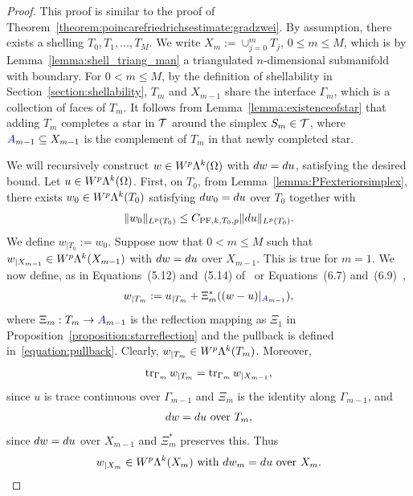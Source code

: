 \documentclass[10pt,a4paper]{article}
\begin{document}
\begin{proof}
    This proof is similar to the proof of Theorem~\ref{theorem:poincarefriedrichsestimate:gradzwei}.
    By assumption, there exists a shelling $T_0, T_1, \dots, T_{M}$. 
    We write $X_m := \cup_{j=0}^{m} T_j$, $0 \leq m \leq M$, which is by Lemma~\ref{lemma:shell_triang_man} a triangulated $n$-dimensional submanifold with boundary. 
    For $0 < m \leq M$, by the definition of shellability in Section~\ref{section:shellability}, 
    $T_{m}$ and $X_{m-1}$ share the interface $\Gamma_{m}$, which is a collection of faces of $T_{m}$. 
    It follows from Lemma~\ref{lemma:existenceofstar} that adding $T_{m}$ completes a star in ${\mathcal T}$ around the simplex $S_{m} \in {\mathcal T}$, 
    where ${\color{blue}A}_{m-1} \subseteq X_{m-1}$ is the complement of $T_{m}$ in that newly completed star. 
    
    We will recursively construct $w \in W^{p}\Lambda^{k}(\Omega)$ with $d w = d u$, satisfying the desired bound. 
    Let $u \in W^{p}\Lambda^{k}(\Omega)$. 
    First, on $T_0$, from Lemma~\ref{lemma:PFexteriorsimplex}, 
    there exists $w_0 \in W^{p}\Lambda^{k}(T_{0})$ satisfying $d w_0 = d u$ over $T_{0}$ together with 
    \begin{gather*}
        \| w_0 \|_{L^{p}(T_{0})} \leq C_{{{\rm PF}},k,T_{0},p} \| d u \|_{L^{p}(T_{0})}.
    \end{gather*}
    We define $w_{|T_0} := w_0$. 
    Suppose now that $0 < m \leq M$ such that $w_{|X_{m-1}} \in W^{p}\Lambda^{k}(X_{m-1})$ with $d w = d u$ over $X_{m-1}$. 
    This is true for $m = 1$. 
    We now define, as in Equations~(5.12) and~(5.14) of~\cite{ern2020stable} or Equations~(6.7) and~(6.9)~\cite{Chaum_Voh_p_rob_3D_H_curl_24},
    \begin{align} \label{equation:w''_ext_der}
        w_{|T_m} := u_{|T_m} + \Xi_{m}^{\ast}((w - u)|_{{\color{blue}A}_{m-1}}),
    \end{align}
    where $\Xi_{m} : T_{m} \rightarrow {\color{blue}A}_{m-1}$ is the reflection mapping
    as $\Xi_{1}$ in Proposition~\ref{proposition:starreflection} and the pullback is defined in~\eqref{equation:pullback}.
    Clearly, $w_{|T_m} \in W^{p}\Lambda^{k}(T_{m})$. Moreover,
    \begin{align*}
        \operatorname{tr}_{\Gamma_{m}} w_{|T_m} = \operatorname{tr}_{\Gamma_{m}} w_{|X_{m-1}},
    \end{align*}
    since $u$ is trace continuous over $\Gamma_{m-1}$ and $\Xi_{m}$ is the identity along $\Gamma_{m-1}$, and
    \begin{align*}
        d w = d u \text{ over } T_m,
    \end{align*}
    since $d w = d u$ over $X_{m-1}$ and $\Xi_{m}^{\ast}$ preserves this. Thus
    \begin{align*}
        w_{|X_{m}} \in W^{p}\Lambda^{k}(X_{m}) \text{ with } d w_{m} = d u \text{ over } X_{m}. 
    \end{align*}
    

\end{proof}
\end{document}
